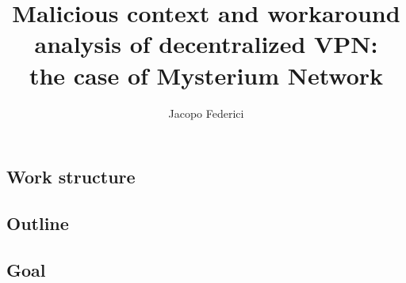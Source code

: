 \documentclass[]{article}
\title{Malicious context and workaround analysis of decentralized VPN:\\the case of Mysterium Network}
\author{Jacopo Federici}
\begin{document}
	\raggedright
	\maketitle	
	\clearpage
	
	\tableofcontents{}
	\pagebreak

	\begin{abstract}
		
	\end{abstract}
	\pagebreak

	\subsection{Work structure}
	\subsection{Outline}
	\subsection{Goal}
\end{document}
